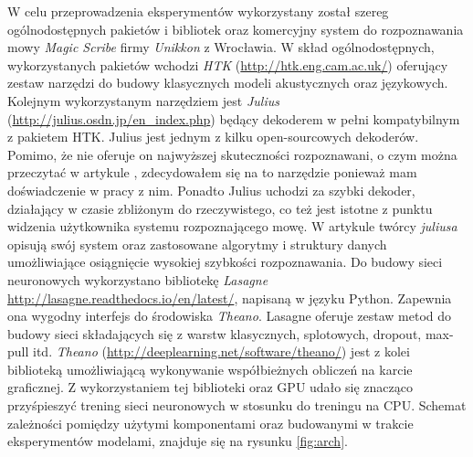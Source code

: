 \documentclass[shortabstract, mgr]{iithesis}
\begin{document}
	W celu przeprowadzenia eksperymentów wykorzystany został szereg ogólnodostępnych pakietów i bibliotek oraz komercyjny system do rozpoznawania mowy \textit{Magic Scribe} firmy \textit{Unikkon} z Wrocławia. W skład ogólnodostępnych, wykorzystanych pakietów wchodzi \textit{HTK} (\url{http://htk.eng.cam.ac.uk/}) oferujący zestaw narzędzi do budowy klasycznych modeli akustycznych oraz językowych. Kolejnym wykorzystanym narzędziem jest \textit{Julius} (\url{http://julius.osdn.jp/en_index.php}) będący dekoderem w pełni kompatybilnym z pakietem HTK. Julius jest jednym z kilku open-sourcowych dekoderów. Pomimo, że nie oferuje on najwyższej skuteczności rozpoznawani, o czym można przeczytać w artykule \cite{asr_toolkit_cmp}, zdecydowałem się na to narzędzie ponieważ mam doświadczenie w pracy z nim. Ponadto Julius uchodzi za szybki dekoder, działający w czasie zbliżonym do rzeczywistego, co też jest istotne z punktu widzenia użytkownika systemu rozpoznającego mowę. W artykule \cite{julius} twórcy \textit{juliusa} opisują swój system oraz zastosowane algorytmy i struktury danych umożliwiające osiągnięcie wysokiej szybkości rozpoznawania. Do budowy sieci neuronowych wykorzystano bibliotekę \textit{Lasagne} \url{http://lasagne.readthedocs.io/en/latest/}, napisaną w języku Python. Zapewnia ona wygodny interfejs do środowiska \textit{Theano}. Lasagne oferuje zestaw metod do budowy sieci składających się z warstw klasycznych, splotowych, dropout, max-pull itd. \textit{Theano} (\url{http://deeplearning.net/software/theano/}) jest z kolei biblioteką umożliwiającą wykonywanie współbieżnych obliczeń na karcie graficznej. Z wykorzystaniem tej biblioteki oraz GPU udało się znacząco przyśpieszyć trening sieci neuronowych w stosunku do treningu na CPU. Schemat zależności pomiędzy użytymi komponentami oraz budowanymi w trakcie eksperymentów modelami, znajduje się na rysunku \ref{fig:arch}. 
	
\end{document}
